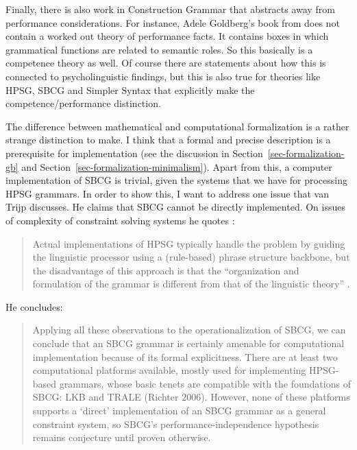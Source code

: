 \addlines[-1]
Finally, there is also work in Construction Grammar that abstracts away from performance
considerations. For instance, Adele Goldberg's book from \citeyear{Goldberg95a} does
not contain a worked out theory of performance facts. It contains boxes in which grammatical
functions are related to semantic roles. So this basically is a competence theory as well. Of course
there are statements about how this is connected to psycholinguistic findings, but this is also true
for theories like HPSG, SBCG and Simpler Syntax \citep[]{Jackendoff2011a} that explicitly make the competence/performance distinction.


The difference between mathematical and computational formalization is a rather strange distinction to make. I
think that a formal and precise description is a prerequisite for implementation (see the discussion
in Section~\ref{sec-formalization-gb} and Section~\ref{sec-formalization-minimalism}). Apart from this, a computer implementation of SBCG is
trivial, given the systems that we have for processing HPSG grammars. In order to show this, I want
to address one issue that van Trijp discusses. He claims that SBCG cannot be directly
implemented. On issues of complexity of constraint solving systems he quotes \citep[Section~4.2.2]{LM2006a}:
\begin{quote}
Actual implementations of HPSG typically handle the problem by guiding the linguistic processor
using a (rule-based) phrase structure backbone, but the disadvantage of this approach is that the ``organization and formulation of the grammar is different from
that of the linguistic theory'' \citep[Section~4.2.2]{LM2006a}. \citep[\page ]{vanTrijp2013a}
\end{quote}
He concludes:
\begin{quote}
Applying all these observations to the operationalization of SBCG, we can
conclude that an SBCG grammar is certainly amenable for computational implementation because of its formal explicitness. There are at least two computational
platforms available, mostly used for implementing HPSG-based grammars, whose
basic tenets are compatible with the foundations of SBCG: LKB \citep{Copestake2002a}
and TRALE (Richter 2006). However, none of these platforms supports a `direct'
implementation of an SBCG grammar as a general constraint system, so SBCG's
performance-independence hypothesis remains conjecture until proven otherwise.
\end{quote}
